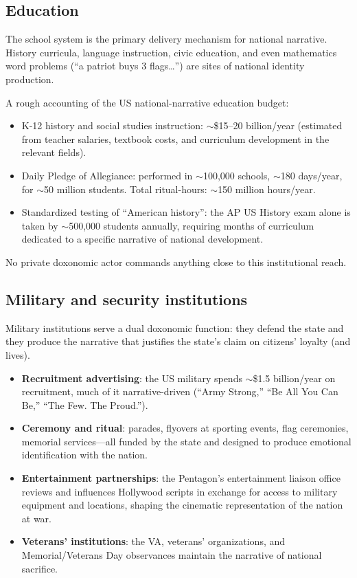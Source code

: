 \subsection{Education}

The school system is the primary delivery mechanism for national narrative.
History curricula, language instruction, civic education, and even mathematics word problems (``a patriot buys 3 flags\ldots'') are sites of national identity production.

\begin{example}
\label{ex:education-national}
A rough accounting of the US national-narrative education budget:
\begin{itemize}[nosep]
  \item K-12 history and social studies instruction: $\sim$\$15--20 billion/year (estimated from teacher salaries, textbook costs, and curriculum development in the relevant fields).
  \item Daily Pledge of Allegiance: performed in $\sim$100,000 schools, $\sim$180 days/year, for $\sim$50 million students. Total ritual-hours: $\sim$150 million hours/year.
  \item Standardized testing of ``American history'': the AP US History exam alone is taken by $\sim$500,000 students annually, requiring months of curriculum dedicated to a specific narrative of national development.
\end{itemize}
No private doxonomic actor commands anything close to this institutional reach.
\end{example}

\subsection{Military and security institutions}

Military institutions serve a dual doxonomic function: they defend the state and they produce the narrative that justifies the state's claim on citizens' loyalty (and lives).

\begin{itemize}[nosep]
  \item \textbf{Recruitment advertising}: the US military spends $\sim$\$1.5 billion/year on recruitment, much of it narrative-driven (``Army Strong,'' ``Be All You Can Be,'' ``The Few. The Proud.'').
  \item \textbf{Ceremony and ritual}: parades, flyovers at sporting events, flag ceremonies, memorial services---all funded by the state and designed to produce emotional identification with the nation.
  \item \textbf{Entertainment partnerships}: the Pentagon's entertainment liaison office reviews and influences Hollywood scripts in exchange for access to military equipment and locations, shaping the cinematic representation of the nation at war.
  \item \textbf{Veterans' institutions}: the VA, veterans' organizations, and Memorial/Veterans Day observances maintain the narrative of national sacrifice.
\end{itemize}

